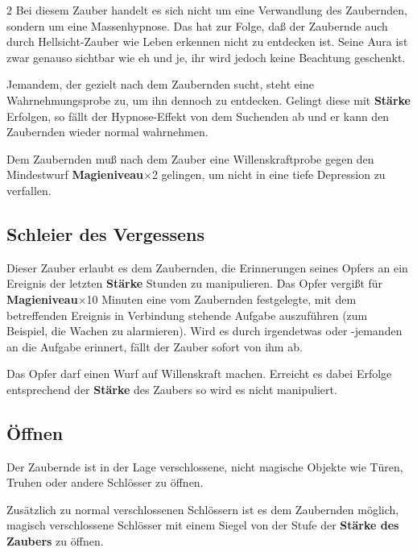 \begin{multicols*}{2}
Bei diesem Zauber handelt es sich nicht um eine Verwandlung des Zaubernden, sondern um eine Massenhypnose. Das hat zur Folge, daß der Zaubernde auch durch Hellsicht-Zauber wie Leben erkennen nicht zu entdecken ist. Seine Aura ist zwar genauso sichtbar wie eh und je, ihr wird jedoch keine Beachtung geschenkt.

Jemandem, der gezielt nach dem Zaubernden sucht, steht eine Wahrnehmungsprobe zu, um ihn dennoch zu entdecken. Gelingt diese mit \textbf{Stärke} Erfolgen, so fällt der Hypnose-Effekt von dem Suchenden ab und er kann den Zaubernden wieder normal wahrnehmen.

Dem Zaubernden muß nach dem Zauber eine Willenskraftprobe gegen den Mindestwurf \textbf{Magieniveau}×2 gelingen, um nicht in eine tiefe Depression zu verfallen.



\subsection{Schleier des Vergessens}

Dieser Zauber erlaubt es dem Zaubernden, die Erinnerungen seines Opfers an ein Ereignis der letzten \textbf{Stärke} Stunden zu manipulieren. Das Opfer vergißt für \textbf{Magieniveau}×10 Minuten eine vom Zaubernden festgelegte, mit dem betreffenden Ereignis in Verbindung stehende Aufgabe auszuführen (zum Beispiel, die Wachen zu alarmieren). Wird es durch irgendetwas oder -jemanden an die Aufgabe erinnert, fällt der Zauber sofort von ihm ab.

Das Opfer darf einen Wurf auf Willenskraft machen. Erreicht es dabei Erfolge entsprechend der \textbf{Stärke} des Zaubers so wird es nicht manipuliert.



\subsection{Öffnen}

Der Zaubernde ist in der Lage verschlossene, nicht magische Objekte wie Türen, Truhen oder andere Schlösser zu öffnen.

Zusätzlich zu normal verschlossenen Schlössern ist es dem Zaubernden möglich, magisch verschlossene Schlösser mit einem Siegel von der Stufe der \textbf{Stärke des Zaubers} zu öffnen.


\end{multicols*}
